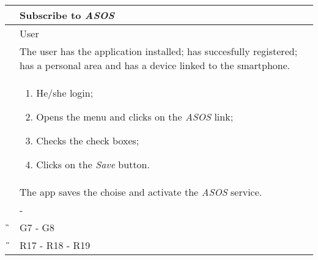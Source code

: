 \begin{center}
	\begin{longtable}{ | p{} | p{} | }
		\hline
		 \A &   Subscribe to \textit{ASOS}\\ 

		\hline
		 \B &  User \\ 

		\hline
  		 \C &  The user has the application installed; has succesfully registered; has a personal area and has a device linked to the smartphone.\\ 

		\hline
		\D & \begin{enumerate}
			\item He/she login;
			\item Opens the menu and clicks on the \textit{ASOS} link;
			\item Checks the check boxes;
			\item Clicks on the \textit{Save} button.
		\end{enumerate} \\

		\hline
		\E & The app saves the choise and activate the \textit{ASOS} service.\\

		\hline
		\F & - \\
		
		\hline
		\G & G7 - G8\\

		\hline
		\H & R17 - R18 - R19 \\
		\hline

	\end{longtable}
\end{center}